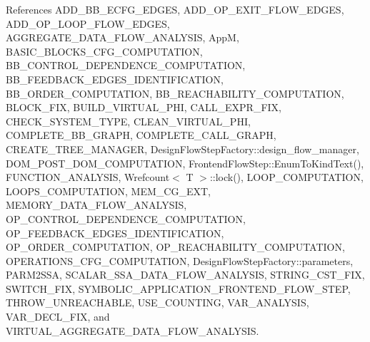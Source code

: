 References A\+D\+D\+\_\+\+B\+B\+\_\+\+E\+C\+F\+G\+\_\+\+E\+D\+G\+ES, A\+D\+D\+\_\+\+O\+P\+\_\+\+E\+X\+I\+T\+\_\+\+F\+L\+O\+W\+\_\+\+E\+D\+G\+ES, A\+D\+D\+\_\+\+O\+P\+\_\+\+L\+O\+O\+P\+\_\+\+F\+L\+O\+W\+\_\+\+E\+D\+G\+ES, A\+G\+G\+R\+E\+G\+A\+T\+E\+\_\+\+D\+A\+T\+A\+\_\+\+F\+L\+O\+W\+\_\+\+A\+N\+A\+L\+Y\+S\+IS, AppM, B\+A\+S\+I\+C\+\_\+\+B\+L\+O\+C\+K\+S\+\_\+\+C\+F\+G\+\_\+\+C\+O\+M\+P\+U\+T\+A\+T\+I\+ON, B\+B\+\_\+\+C\+O\+N\+T\+R\+O\+L\+\_\+\+D\+E\+P\+E\+N\+D\+E\+N\+C\+E\+\_\+\+C\+O\+M\+P\+U\+T\+A\+T\+I\+ON, B\+B\+\_\+\+F\+E\+E\+D\+B\+A\+C\+K\+\_\+\+E\+D\+G\+E\+S\+\_\+\+I\+D\+E\+N\+T\+I\+F\+I\+C\+A\+T\+I\+ON, B\+B\+\_\+\+O\+R\+D\+E\+R\+\_\+\+C\+O\+M\+P\+U\+T\+A\+T\+I\+ON, B\+B\+\_\+\+R\+E\+A\+C\+H\+A\+B\+I\+L\+I\+T\+Y\+\_\+\+C\+O\+M\+P\+U\+T\+A\+T\+I\+ON, B\+L\+O\+C\+K\+\_\+\+F\+IX, B\+U\+I\+L\+D\+\_\+\+V\+I\+R\+T\+U\+A\+L\+\_\+\+P\+HI, C\+A\+L\+L\+\_\+\+E\+X\+P\+R\+\_\+\+F\+IX, C\+H\+E\+C\+K\+\_\+\+S\+Y\+S\+T\+E\+M\+\_\+\+T\+Y\+PE, C\+L\+E\+A\+N\+\_\+\+V\+I\+R\+T\+U\+A\+L\+\_\+\+P\+HI, C\+O\+M\+P\+L\+E\+T\+E\+\_\+\+B\+B\+\_\+\+G\+R\+A\+PH, C\+O\+M\+P\+L\+E\+T\+E\+\_\+\+C\+A\+L\+L\+\_\+\+G\+R\+A\+PH, C\+R\+E\+A\+T\+E\+\_\+\+T\+R\+E\+E\+\_\+\+M\+A\+N\+A\+G\+ER, Design\+Flow\+Step\+Factory\+::design\+\_\+flow\+\_\+manager, D\+O\+M\+\_\+\+P\+O\+S\+T\+\_\+\+D\+O\+M\+\_\+\+C\+O\+M\+P\+U\+T\+A\+T\+I\+ON, Frontend\+Flow\+Step\+::\+Enum\+To\+Kind\+Text(), F\+U\+N\+C\+T\+I\+O\+N\+\_\+\+A\+N\+A\+L\+Y\+S\+IS, Wrefcount$<$ T $>$\+::lock(), L\+O\+O\+P\+\_\+\+C\+O\+M\+P\+U\+T\+A\+T\+I\+ON, L\+O\+O\+P\+S\+\_\+\+C\+O\+M\+P\+U\+T\+A\+T\+I\+ON, M\+E\+M\+\_\+\+C\+G\+\_\+\+E\+XT, M\+E\+M\+O\+R\+Y\+\_\+\+D\+A\+T\+A\+\_\+\+F\+L\+O\+W\+\_\+\+A\+N\+A\+L\+Y\+S\+IS, O\+P\+\_\+\+C\+O\+N\+T\+R\+O\+L\+\_\+\+D\+E\+P\+E\+N\+D\+E\+N\+C\+E\+\_\+\+C\+O\+M\+P\+U\+T\+A\+T\+I\+ON, O\+P\+\_\+\+F\+E\+E\+D\+B\+A\+C\+K\+\_\+\+E\+D\+G\+E\+S\+\_\+\+I\+D\+E\+N\+T\+I\+F\+I\+C\+A\+T\+I\+ON, O\+P\+\_\+\+O\+R\+D\+E\+R\+\_\+\+C\+O\+M\+P\+U\+T\+A\+T\+I\+ON, O\+P\+\_\+\+R\+E\+A\+C\+H\+A\+B\+I\+L\+I\+T\+Y\+\_\+\+C\+O\+M\+P\+U\+T\+A\+T\+I\+ON, O\+P\+E\+R\+A\+T\+I\+O\+N\+S\+\_\+\+C\+F\+G\+\_\+\+C\+O\+M\+P\+U\+T\+A\+T\+I\+ON, Design\+Flow\+Step\+Factory\+::parameters, P\+A\+R\+M2\+S\+SA, S\+C\+A\+L\+A\+R\+\_\+\+S\+S\+A\+\_\+\+D\+A\+T\+A\+\_\+\+F\+L\+O\+W\+\_\+\+A\+N\+A\+L\+Y\+S\+IS, S\+T\+R\+I\+N\+G\+\_\+\+C\+S\+T\+\_\+\+F\+IX, S\+W\+I\+T\+C\+H\+\_\+\+F\+IX, S\+Y\+M\+B\+O\+L\+I\+C\+\_\+\+A\+P\+P\+L\+I\+C\+A\+T\+I\+O\+N\+\_\+\+F\+R\+O\+N\+T\+E\+N\+D\+\_\+\+F\+L\+O\+W\+\_\+\+S\+T\+EP, T\+H\+R\+O\+W\+\_\+\+U\+N\+R\+E\+A\+C\+H\+A\+B\+LE, U\+S\+E\+\_\+\+C\+O\+U\+N\+T\+I\+NG, V\+A\+R\+\_\+\+A\+N\+A\+L\+Y\+S\+IS, V\+A\+R\+\_\+\+D\+E\+C\+L\+\_\+\+F\+IX, and V\+I\+R\+T\+U\+A\+L\+\_\+\+A\+G\+G\+R\+E\+G\+A\+T\+E\+\_\+\+D\+A\+T\+A\+\_\+\+F\+L\+O\+W\+\_\+\+A\+N\+A\+L\+Y\+S\+IS.




